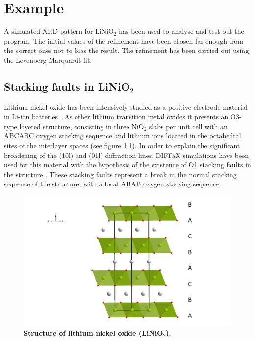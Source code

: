 \chapter{Example}
\label{example}
\setcounter{page}{19}



A simulated XRD pattern for LiNiO$_{2}$ has been used to analyse and test out the program. 
The initial values of the refinement have been chosen far enough from the correct ones not to bias the result.
The refinement has  been carried out using the Levenberg-Marquardt fit. 


\section{Stacking faults in LiNiO$_{2}$}

Lithium nickel oxide has been intensively studied as a positive electrode material in Li-ion batteries \cite{Whit2004}. 
As other lithium transition metal oxides it presents an O3-type layered structure, consisting in three NiO$_{2}$ slabs per unit cell with an ABCABC oxygen stacking sequence and lithium ions located in the octahedral sites of the interlayer spaces (see figure \ref{estructura}). In order to explain the significant broadening of the (10l) and (01l) diffraction lines, DIFFaX simulations have been used for this material with the hypothesis of the existence of O1 stacking faults in the structure \cite{Crog2000}. These stacking faults represent a break in the normal stacking sequence of the structure, with a local ABAB oxygen stacking sequence.

\begin{figure}[!htbp]
\begin{center}
\includegraphics [width=4 in]{LiNO_estructura.png}
\caption{\bf Structure of lithium nickel oxide (LiNiO$_{2}$).}
\label{estructura}
\end{center}
\end{figure}

